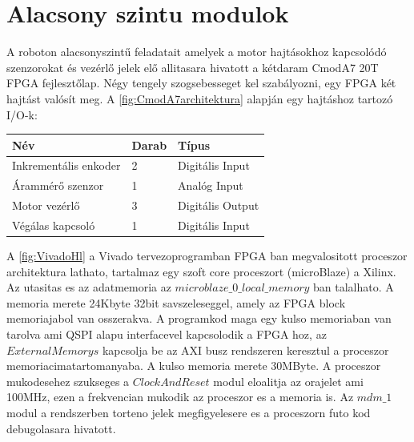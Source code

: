 
\section{Alacsony szintu modulok} 

A roboton alacsonyszintű feladatait amelyek a motor hajtásokhoz kapcsolódó szenzorokat és vezérlő jelek elő allitasara hivatott a kétdaram CmodA7 20T FPGA fejlesztőlap. Négy tengely szogsebesseget kel szabályozni, egy FPGA két hajtást valósít meg. A \ref{fig:CmodA7architektura} alapján egy hajtáshoz tartozó I/O-k:

\begin{table}[H]
\center
\begin{tabular}{lll}
\hline Név                            & Darab              & Típus  \\ \hline
Inkrementális enkoder           & 2           & Digitális Input \\
Árammérő szenzor                & 1                  & Analóg Input \\
Motor vezérlő                   & 3                  & Digitális Output \\
Végálas kapcsoló                 & 1                  & Digitális Input        
\end{tabular}
\end{table}




\renewcommand{\img}{SajatRobot/SzerkAbrak/cmoda7modulok.jpg}
\renewcommand{\sources}{*}
\renewcommand{\captionn}{CmodA7 FPGA-ban kialakított architektúra amely a szenzorok és motor hajtások kezelésre hivatott }
\renewcommand{\figlabel}{CmodA7architektura}



A \ref{fig:VivadoHl} a Vivado tervezoprogramban FPGA ban megvalositott proceszor architektura lathato, tartalmaz egy szoft core proceszort (microBlaze) a Xilinx. Az utasitas es az adatmemoria az $microblaze\_0\_local\_memory$ ban talalhato. A memoria merete 24Kbyte 32bit savszeleseggel, amely az FPGA block memoriajabol van osszerakva. A programkod maga egy kulso memoriaban van tarolva ami QSPI alapu interfacevel kapcsolodik a FPGA hoz, az $ExternalMemorys$ kapcsolja be az AXI busz rendszeren keresztul a proceszor memoriacimatartomanyaba. A kulso memoria merete 30MByte. A proceszor mukodesehez szukseges a $ClockAndReset$ modul eloalitja az orajelet ami 100MHz, ezen a frekvencian mukodik az proceszor es a memoria is. Az $mdm\_1$ modul a rendszerben torteno jelek megfigyelesere es a proceszorn futo kod debugolasara hivatott.

